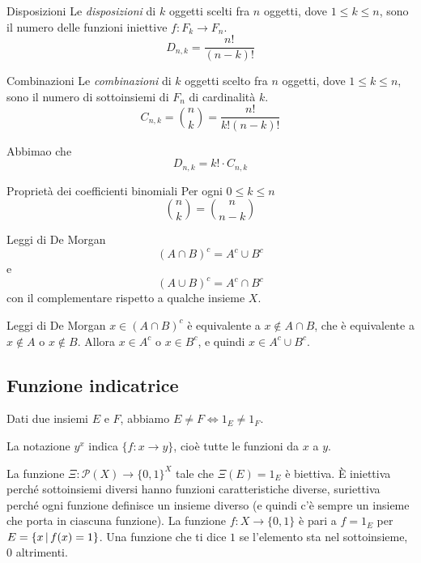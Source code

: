 \documentclass[a4paper]{article}
\begin{document}
\begin{snippetdefinition}{Disposizioni}
    Le \textit{disposizioni} di \(k\) oggetti scelti fra \(n\) oggetti,
    dove \(1\leq k \leq n\), sono il numero delle funzioni
    iniettive \(f\colon F_k \to F_n\).
    \[
        D_{n,k} = \frac{n!}{(n-k)!}
    \]
\end{snippetdefinition}

\begin{snippetdefinition}{Combinazioni}
    Le \textit{combinazioni} di \(k\) oggetti scelto fra \(n\) oggetti,
    dove \(1\leq k \leq n\), sono il numero di sottoinsiemi di \(F_n\)
    di cardinalità \(k\).
    \[
        C_{n,k} = \binom{n}{k} = \frac{n!}{k!(n-k)!}
    \]
\end{snippetdefinition}

Abbimao che
\[
    D_{n,k} = k! \cdot C_{n,k}
\]

\begin{snippetlemma}{Proprietà dei coefficienti binomiali}
    Per ogni \(0 \leq k \leq n\)
    \[
        \binom{n}{k} = \binom{n}{n-k}
    \]
\end{snippetlemma}

\pagebreak

\begin{snippettheorem}{Leggi di De Morgan}
    \[
        {(A \cap B)}^c = A^c \cup B^c
    \]
    e
    \[
        {(A \cup B)}^c = A^c \cap B^c
    \]
    con il complementare rispetto a qualche insieme \(X\).
\end{snippettheorem}

\begin{snippetproof}{Leggi di De Morgan}
    \(x\in {(A \cap B)}^c\) è equivalente a  \(x \notin A \cap B\),
    che è equivalente a \(x\notin A\) o \(x\notin B\).
    Allora \(x\in A^c\) o \(x\in B^c\), e quindi \(x \in A^c \cup B^c\).
\end{snippetproof}

\subsection{Funzione indicatrice}

Dati due insiemi \(E\) e \(F\), abbiamo \(E \neq F \iff 1_E \neq 1_F\).

La notazione \(y^x\) indica \(\{ f\colon x \to y \}\), cioè tutte le funzioni da \(x\) a \(y\).

La funzione \(\Xi \colon \mathcal{P}(X) \to {\{ 0,1 \}}^X\) tale che
\(\Xi(E) = 1_E\) è biettiva.
È iniettiva perché sottoinsiemi diversi hanno funzioni caratteristiche diverse,
suriettiva perché ogni funzione definisce un insieme diverso (e quindi c'è sempre un insieme che porta in ciascuna funzione).
La funzione \(f\colon X \to \{0,1\}\) è pari a \(f=1_E\) per
\(E = \{ x \,|\, f(x)=1 \}\).
Una funzione che ti dice \(1\) se l'elemento sta nel sottoinsieme, 0 altrimenti.
\end{document}
